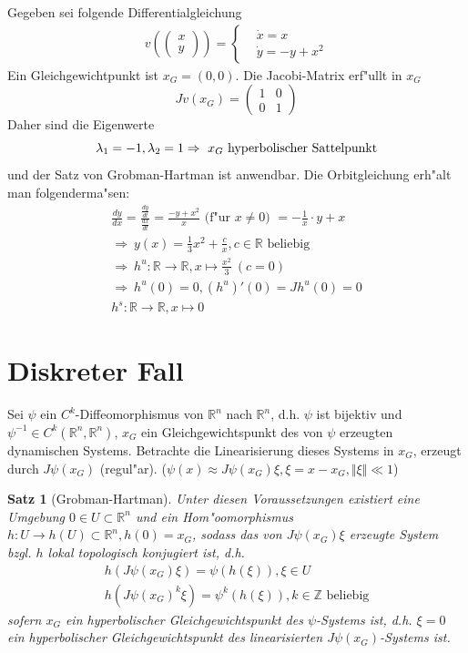 \documentclass[a4paper, 13pt]{scrreprt}
\newtheorem{satz}{Satz}[section]
\theoremstyle{definition} \newtheorem{definition}{Definition}[section]
\newenvironment{beispiel}[1][Beispiel]{\begin{trivlist}
\item[\hskip \labelsep {\bfseries #1}]}{\end{trivlist}}
\begin{document}
\begin{beispiel}
Gegeben sei folgende Differentialgleichung
\begin{align*}
v( \begin{pmatrix} x \\ y\end{pmatrix} ) = \begin{cases}
&\dot{x}=x\\
&\dot{y}=-y+x^2
\end{cases}
\end{align*}
Ein Gleichgewichtpunkt ist $x_G=(0,0)$. Die Jacobi-Matrix erf"ullt in $x_G$ 
\[Jv(x_G)=\begin{pmatrix} 1&0\\ 0&1 \end{pmatrix}\]
Daher sind die Eigenwerte 
\[ \lambda_1=-1, \lambda_2=1\\
\Rightarrow\ x_G  \text{ hyperbolischer Sattelpunkt}\]
und der Satz von Grobman-Hartman ist anwendbar. Die Orbitgleichung erh"alt man folgenderma"sen:
\begin{align*}
\frac{dy}{dx}=\frac{\frac{dy}{dt}}{\frac{dx}{dt}}=\frac{-y+x^2}{x} \text{ (f"ur $x\neq 0$) } =-\frac 1 x \cdot y+x\\
\Rightarrow\ y(x)=\frac 1 3 x^2+\frac c x, c\in\mathbb{R} \text{ beliebig} \\
\Rightarrow\ h^u:\mathbb{R}\to\mathbb{R}, x\mapsto\frac{x^2} 3\ (c=0)\\
\Rightarrow\ h^u(0)=0, (h^u)'(0)=Jh^u(0)=0\\
h^s:\mathbb{R}\to\mathbb{R}, x\mapsto 0
\end{align*}
\end{beispiel}


\section{Diskreter Fall}
Sei $\psi$ ein $C^k$-Diffeomorphismus von $\mathbb{R}^n$ nach $\mathbb{R}^n$, d.h. $\psi$ ist bijektiv und $\psi^{-1}\in C^k(\mathbb{R}^{n},\mathbb{R}^{n})$, $x_G$ ein Gleichgewichtspunkt des von $\psi$ erzeugten dynamischen Systems. Betrachte die Linearisierung dieses Systems in $x_G$, erzeugt durch $J\psi(x_G)$ (regul"ar). ($\psi(x)\approx J\psi(x_G)\xi, \xi=x-x_G, \Vert\xi\Vert\ll 1$)

\begin{satz}[Grobman-Hartman]
Unter diesen Voraussetzungen existiert eine Umgebung $0\in U\subset \mathbb{R}^n$ und ein Hom"oomorphismus $h:U\to h(U)\subset\mathbb{R}^n, h(0)=x_G$, sodass das von $J\psi(x_G)\xi$ erzeugte System bzgl. $h$ lokal topologisch konjugiert ist, d.h.
\begin{align*}
h(J\psi(x_G)\xi)=\psi(h(\xi)), \xi\in U\\
h(J\psi(x_G)^k\xi)=\psi^k(h(\xi)), k\in\mathbb{Z} \text{ beliebig}
\end{align*}
sofern $x_G$ ein hyperbolischer Gleichgewichtspunkt des $\psi$-Systems ist, d.h. $\xi=0$ ein hyperbolischer Gleichgewichtspunkt des linearisierten $J\psi(x_G)$-Systems ist.
\end{satz}
\end{document}
